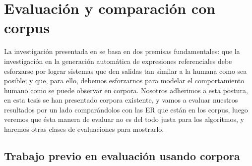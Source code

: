 \section{Evaluaci\'on y comparaci\'on con corpus}

\label{sec:metricas_evaluacion}

La investigaci\'on presentada en \cite{viethen-phd} se basa en dos premisas fundamentales: que la investigaci\'on
en la generaci\'on autom\'atica de expresiones referenciales debe esforzarse por lograr
sistemas que den salidas tan similar a la humana como sea posible; y que, para ello, debemos
esforzarnos para modelar el comportamiento humano como se puede observar en corpora. Nosotros adherimos a esta postura, en esta tesis se han presentado corpora existente, y vamos a evaluar nuestros resultados por un lado compar\'andolos con las ER que est\'an en los corpus, luego veremos que \'esta manera de evaluar no es del todo justa para los algoritmos, y haremos otras clases de evaluaciones para mostrarlo.


\subsection{Trabajo previo en evaluaci\'on usando corpora}
%

%
%

